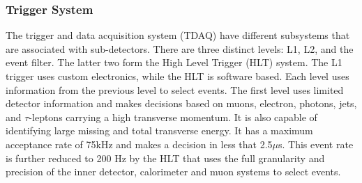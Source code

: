 \subsubsection{Trigger System}
The trigger and data acquisition system (TDAQ) have different subsystems that are associated with sub-detectors.
There are three distinct levels: L1, L2, and the event filter.
The latter two form the High Level Trigger (HLT) system.
The L1 trigger uses custom electronics, while the HLT is software based.
Each level uses information from the previous level to select events.
%
%
The first level uses limited detector information and makes decisions based on muons, electron, photons, jets, and $\tau$-leptons carrying a high transverse momentum.
It is also capable of identifying large missing and total transverse energy.
 It has a maximum acceptance rate of 75kHz and makes a decision in less that 2.5$\mu$s.
This event rate is further reduced to 200 Hz by the HLT that uses the full granularity and precision of the inner detector, calorimeter and muon systems to select events.



%

